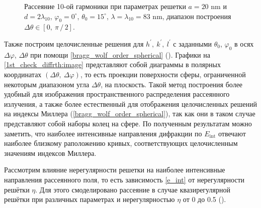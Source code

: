 \begin{figure}[H]
    \hfil
    \caption{Рассеяние 10-ой гармоники при параметрах решетки $a = 20$ nm и $d = 2\lambda_{10}$, $\varphi_0 = 0^{\circ}$, $\theta_0 = 15^{\circ}$, $\lambda = \lambda_{10} = 83$ nm, диапазон построения $\Delta \theta \in \left[ 0,\:\pi\,/\,2 \right]$.}\label{1st_check_diffrth:image}
\end{figure}

Также построим целочисленные решения для $h^\prime,\:k^\prime,\:l^\prime$ с заданными $\theta_0$, $\varphi_0$ в осях $\Delta \varphi$, $\Delta \theta$ при помощи \autoref{bragg_wolf_order_spherical} (). Графики на \autoref{1st_check_diffrth:image} представляют собой диаграммы в полярных координатах $(\Delta \theta, \: \Delta \varphi)$, то есть проекции поверхности сферы, ограниченной некоторым диапазоном угла $\Delta \theta$, на плоскость. Такой метод построения более удобный для изображения пространственного распределения рассеянного излучения, а также более естественный для отображения целочисленных решений на индексы Миллера (\autoref{bragg_wolf_order_spherical}), так как они в таком случае представляют собой наборы колец на сфере. По полученным результатам можно заметить, что наиболее интенсивные направления дифракции по $E_{\textrm{int}}$ отвечают наиболее близкому раположению кривых, соответствующих целочисленным значениям индексов Миллера.

Рассмотрим влияние нерегулярности решетки на наиболее интенсивные направления рассеянного поля, то есть зависимость \autoref{e_int} от нерегулярности решётки $\eta$. Для этого смоделировано рассеяние в случае квазирегулярной решётки при различных параметрах и нерегулярностью $\eta$ от 0 до 0.5 ().

